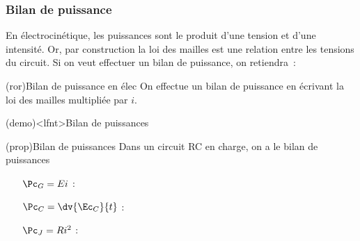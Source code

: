 \documentclass[../../main/main.tex]{subfiles}
\begin{document}
\subsubsection{Bilan de puissance}

En électrocinétique, les puissances sont le produit d'une tension et d'une
intensité. Or, par construction la loi des mailles est une relation entre les
tensions du circuit. Si on veut effectuer un bilan de puissance, on retiendra~:

\begin{tcb}[fontupper=\Large, bld, cnt](ror){Bilan de puissance en élec}
	On effectue un bilan de puissance en écrivant la loi des mailles multipliée
	par $i$.
\end{tcb}
\begin{tcb}[label=demo:rcpuiss-charge](demo)<lfnt>{Bilan de puissances}
	\vspace{-15pt}
	\vspace{-15pt}
\end{tcb}
\begin{tcb}[label=prop:rcpuiss-charge](prop){Bilan de puissances}
	Dans un circuit RC en charge, on a le bilan de puissances
	\psw{
		\[
			\boxed{\Pc_G = \Pc_C + \Pc_J}
		\]
	}
	\vspace{-15pt}
	\begin{itemize}[leftmargin=50pt]
		\item[$\Pc_G = Ei$] : 
		\item[$\Pc_C = \dv{\Ec_C}{t}$] : 
		\item[$\Pc_J = Ri^{2}$] : 
	\end{itemize}
\end{tcb}
\end{document}
